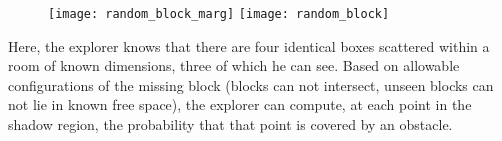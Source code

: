 \begin{frame}
\begin{figure}
\texttt{[image: random\_block\_marg]}
\texttt{[image: random\_block]}
\end{figure}
Here, the explorer knows that 
there are four identical boxes scattered within a
room of known dimensions, three of which he can see.
Based on allowable configurations 
of the missing block (blocks can not intersect, 
unseen blocks can not lie in known free space), the
explorer can compute, at each point in the shadow region,
the probability that that point is covered by an obstacle.
\end{frame}
